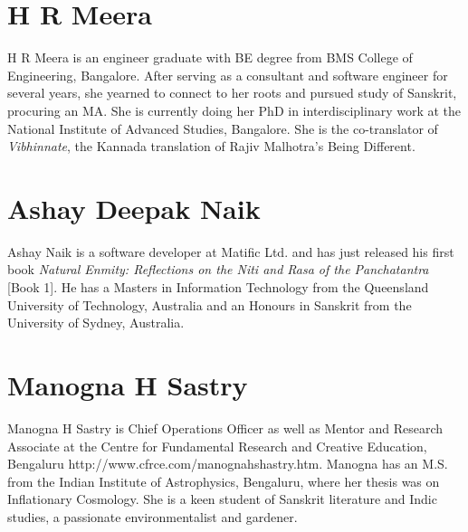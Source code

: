 \section*{H R Meera}

H R Meera is an engineer graduate with BE degree from BMS College of Engineering, Bangalore. After serving as a consultant and software engineer for several years, she yearned to connect to her roots and pursued study of Sanskrit, procuring an MA\@. She is currently doing her PhD in interdisciplinary work at the National Institute of Advanced Studies, Bangalore. She is the co-translator of {\sl Vibhinnate}, the Kannada translation of Rajiv Malhotra’s Being Different.

\section*{Ashay Deepak Naik}

Ashay Naik is a software developer at Matific Ltd. and has just released his first book {\sl Natural Enmity: Reflections on the Niti and Rasa of the Panchatantra} [Book 1]. He has a Masters in Information Technology from the Queensland University of Technology, Australia and an Honours in Sanskrit from the University of Sydney, Australia.

\section*{Manogna H Sastry}

Manogna H Sastry is Chief Operations Officer as well as Mentor and Research Associate at the Centre for Fundamental Research and Creative Education, Bengaluru http://www.cfrce.com/manognahshastry.htm. Manogna has an M.S. from the Indian Institute of Astrophysics, Bengaluru, where her thesis was on Inflationary Cosmology. She is a keen student of Sanskrit literature and Indic studies, a passionate environmentalist and gardener.
